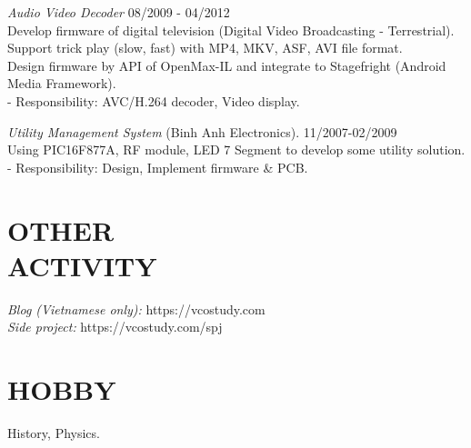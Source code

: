 \documentclass[margin]{res}
\begin{document}
\begin{resume}
                {\sl Audio Video Decoder} \hfill            08/2009 - 04/2012 \\
                 Develop firmware of digital television (Digital Video Broadcasting - Terrestrial).\\
                 Support trick play (slow, fast) with MP4, MKV, ASF, AVI file format.\\
                 Design firmware by API of OpenMax-IL and integrate to Stagefright (Android Media Framework).\\
		 - Responsibility: AVC/H.264 decoder, Video display.


                {\sl Utility Management System} (Binh Anh Electronics). \hfill        11/2007-02/2009 \\
                Using PIC16F877A, RF module, LED 7 Segment to develop some utility solution.\\
		- Responsibility: Design, Implement firmware \& PCB.

 
\section{OTHER \\ ACTIVITY}  
		{\sl Blog (Vietnamese only):} https://vcostudy.com \\
		{\sl Side project:} https://vcostudy.com/spj

\section{HOBBY}  History, Physics.


\end{resume}
\end{document}
